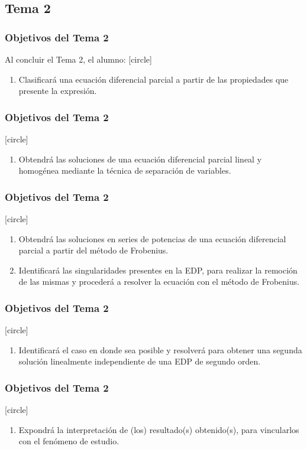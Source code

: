 \subsection{Tema 2}
\begin{frame}
\frametitle{Objetivos del Tema 2}
Al concluir el Tema 2, el alumno:
[circle]
\begin{enumerate}
\item Clasificará una ecuación diferencial parcial a partir de las propiedades que presente la expresión.
\seti
\end{enumerate}
\end{frame}
\begin{frame}
\frametitle{Objetivos del Tema 2}
[circle]
\begin{enumerate}
\conti
\item Obtendrá las soluciones de una ecuación diferencial parcial lineal y homogénea mediante la técnica de separación de variables.
\seti
\end{enumerate}
\end{frame}
\begin{frame}
\frametitle{Objetivos del Tema 2}
[circle]
\begin{enumerate}[<+->]
\conti
\item Obtendrá las soluciones en series de potencias de una ecuación diferencial parcial a partir del método de Frobenius.
\item Identificará las singularidades presentes en la EDP, para realizar la remoción de las mismas y procederá a resolver la ecuación con el método de Frobenius.
\seti
\end{enumerate}
\end{frame}
\begin{frame}
\frametitle{Objetivos del Tema 2}
[circle]
\begin{enumerate}
\conti
\item Identificará el caso en donde sea posible y resolverá para obtener una segunda solución linealmente independiente de una EDP de segundo orden.
\seti
\end{enumerate}
\end{frame}
\begin{frame}
\frametitle{Objetivos del Tema 2}
[circle]
\begin{enumerate}
\conti
\item Expondrá la interpretación de (los) resultado(s) obtenido(s), para vincularlos con el fenómeno de estudio.
\seti
\end{enumerate}
\end{frame}
